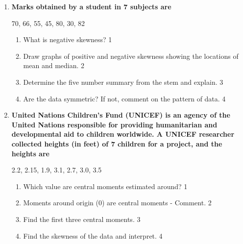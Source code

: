 \documentclass[a4paper,oneside]{book}
\begin{document}
\begin{enumerate}
\begin{center}
56, 62, 68, 71, 65, 59, 74, 67, 70, 63
\end{center}

\begin{enumerate}
\item
Calculate the first four moments \footnote{62.5, 3934.5, 249407.5, 15915069} about 3. \hfill 3
\item
Compute the variance and kurtosis of the data using converted central moments. 
Explain what the kurtosis indicates about the distribution. \hfill 4
\end{enumerate}


 \item
	  \textbf{Marks obtained by a student in 7 subjects are} 
	  \begin{center}
	  70, 66, 55, 45, 80, 30, 82
	\end{center}
  
  \begin{enumerate}
    \item
	What is negative skewness? \hfill 1
    \item
	Draw graphs of positive and negative skewness showing the locations of mean and median. \hfill 2
    \item  
	Determine the five number summary from the stem and explain. \hfill 3
    \item
	Are the data symmetric? If not, comment on the pattern of data. \hfill 4
\end{enumerate}

 \item
	  \textbf{United Nations Children's Fund (UNICEF) is an agency of the United Nations responsible for providing humanitarian and developmental aid to children worldwide. A  UNICEF researcher collected heights (in feet) of 7 children for a project, and the heights are} 

	\begin{center}
	  2.2, 2.15, 1.9, 3.1, 2.7, 3.0, 3.5
	  	\end{center}
  
  \begin{enumerate}
    \item
	Which value are central moments estimated around? \hfill 1
    \item
	Moments around origin (0) are central moments - Comment. \hfill 2
    \item  
	Find the first three central moments. \hfill 3
    \item
	Find the skewness of the data and interpret.  \hfill 4
  \end{enumerate}
  


\end{enumerate}
\end{document}
